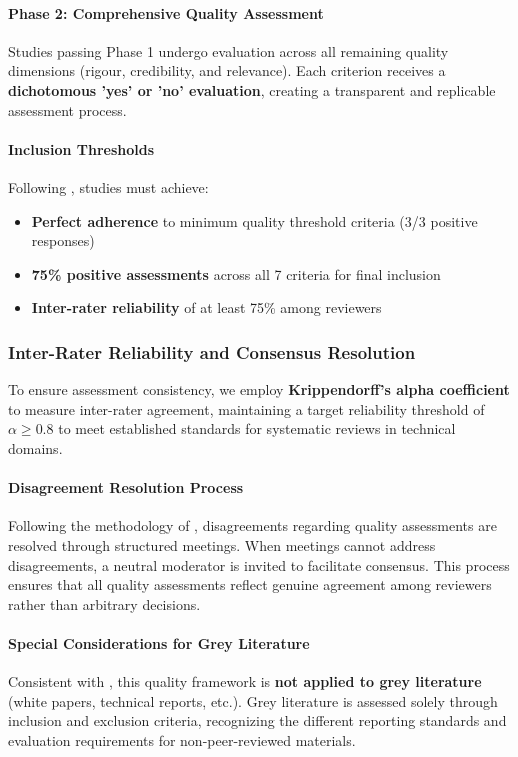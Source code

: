 \documentclass[acmsmall]{acmart}
\begin{document}
\paragraph{Phase 2: Comprehensive Quality Assessment}
Studies passing Phase 1 undergo evaluation across all remaining quality dimensions (rigour, credibility, and relevance). Each criterion receives a \textbf{dichotomous 'yes' or 'no' evaluation}, creating a transparent and replicable assessment process.

\paragraph{Inclusion Thresholds}
Following \citet{ataei2022state}, studies must achieve:
\begin{itemize}
    \item \textbf{Perfect adherence} to minimum quality threshold criteria (3/3 positive responses)
    \item \textbf{75\% positive assessments} across all 7 criteria for final inclusion
    \item \textbf{Inter-rater reliability} of at least 75\% among reviewers
\end{itemize}

\subsubsection{Inter-Rater Reliability and Consensus Resolution}\label{subsubsec:phase-3-quality-assessment:inter-rater-reliability-and-consensus-resolution}
To ensure assessment consistency, we employ \textbf{Krippendorff's alpha coefficient} \citep{krippendorff2018content} to measure inter-rater agreement, maintaining a target reliability threshold of $\alpha \geq 0.8$ to meet established standards for systematic reviews in technical domains.

\paragraph{Disagreement Resolution Process}
Following the methodology of \citet{ataei2022state}, disagreements regarding quality assessments are resolved through structured meetings. When meetings cannot address disagreements, a neutral moderator is invited to facilitate consensus. This process ensures that all quality assessments reflect genuine agreement among reviewers rather than arbitrary decisions.

\paragraph{Special Considerations for Grey Literature}
Consistent with \citet{ataei2022state}, this quality framework is \textbf{not applied to grey literature} (white papers, technical reports, etc.). Grey literature is assessed solely through inclusion and exclusion criteria, recognizing the different reporting standards and evaluation requirements for non-peer-reviewed materials.
\end{document}
